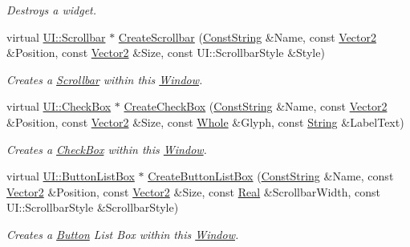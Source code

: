 \begin{DoxyCompactItemize}
\begin{DoxyCompactList}\small\item\em Destroys a widget. \item\end{DoxyCompactList}\item 
virtual \hyperlink{classphys_1_1UI_1_1Scrollbar}{UI::Scrollbar} $\ast$ \hyperlink{classphys_1_1UI_1_1Window_a2cc4a328593aa23f48314a893315f630}{CreateScrollbar} (\hyperlink{namespacephys_a5ce5049f8b4bf88d6413c47b504ebb31}{ConstString} \&Name, const \hyperlink{classphys_1_1Vector2}{Vector2} \&Position, const \hyperlink{classphys_1_1Vector2}{Vector2} \&Size, const UI::ScrollbarStyle \&Style)
\begin{DoxyCompactList}\small\item\em Creates a \hyperlink{classphys_1_1UI_1_1Scrollbar}{Scrollbar} within this \hyperlink{classphys_1_1UI_1_1Window}{Window}. \item\end{DoxyCompactList}\item 
virtual \hyperlink{classphys_1_1UI_1_1CheckBox}{UI::CheckBox} $\ast$ \hyperlink{classphys_1_1UI_1_1Window_ad412fbb38a4c9e0d64ae68921364badf}{CreateCheckBox} (\hyperlink{namespacephys_a5ce5049f8b4bf88d6413c47b504ebb31}{ConstString} \&Name, const \hyperlink{classphys_1_1Vector2}{Vector2} \&Position, const \hyperlink{classphys_1_1Vector2}{Vector2} \&Size, const \hyperlink{namespacephys_a460f6bc24c8dd347b05e0366ae34f34a}{Whole} \&Glyph, const \hyperlink{namespacephys_aa03900411993de7fbfec4789bc1d392e}{String} \&LabelText)
\begin{DoxyCompactList}\small\item\em Creates a \hyperlink{classphys_1_1UI_1_1CheckBox}{CheckBox} within this \hyperlink{classphys_1_1UI_1_1Window}{Window}. \item\end{DoxyCompactList}\item 
virtual \hyperlink{classphys_1_1UI_1_1ButtonListBox}{UI::ButtonListBox} $\ast$ \hyperlink{classphys_1_1UI_1_1Window_ad6d2dd31e586f2d6db2706731cdb271d}{CreateButtonListBox} (\hyperlink{namespacephys_a5ce5049f8b4bf88d6413c47b504ebb31}{ConstString} \&Name, const \hyperlink{classphys_1_1Vector2}{Vector2} \&Position, const \hyperlink{classphys_1_1Vector2}{Vector2} \&Size, const \hyperlink{namespacephys_af7eb897198d265b8e868f45240230d5f}{Real} \&ScrollbarWidth, const UI::ScrollbarStyle \&ScrollbarStyle)
\begin{DoxyCompactList}\small\item\em Creates a \hyperlink{classphys_1_1UI_1_1Button}{Button} List Box within this \hyperlink{classphys_1_1UI_1_1Window}{Window}. \item\end{DoxyCompactList}\item 

\end{DoxyCompactItemize}
